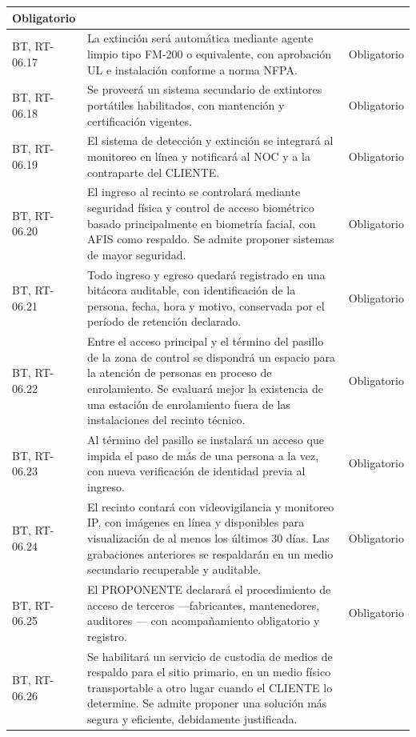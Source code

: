 \begin{longtable}{|L{0.098425\AnchoTablaAnexo}|L{0.814961\AnchoTablaAnexo}|L{0.086614\AnchoTablaAnexo}|}
Obligatorio \\ \hline
{}
BT, RT-06.17 &
La extinción será automática mediante agente limpio tipo FM-200 o equivalente, con aprobación UL e instalación conforme a norma NFPA. &
Obligatorio \\ \hline
BT, RT-06.18 &
Se proveerá un sistema secundario de extintores portátiles habilitados, con mantención y certificación vigentes. &
Obligatorio \\ \hline
{}
BT, RT-06.19 &
El sistema de detección y extinción se integrará al monitoreo en línea y notificará al NOC y a la contraparte del CLIENTE. &
Obligatorio \\ \hline
BT, RT-06.20 &
El ingreso al recinto se controlará mediante seguridad física y control de acceso biométrico basado principalmente en biometría facial, con AFIS como respaldo. Se admite proponer sistemas de mayor seguridad. &
Obligatorio \\ \hline
{}
BT, RT-06.21 &
Todo ingreso y egreso quedará registrado en una bitácora auditable, con identificación de la persona, fecha, hora y motivo, conservada por el período de retención declarado. &
Obligatorio \\ \hline
BT, RT-06.22 &
Entre el acceso principal y el término del pasillo de la zona de control se dispondrá un espacio para la atención de personas en proceso de enrolamiento. Se evaluará mejor la existencia de una estación de enrolamiento fuera de las instalaciones del recinto técnico. &
Obligatorio \\ \hline
{}
BT, RT-06.23 &
Al término del pasillo se instalará un acceso que impida el paso de más de una persona a la vez, con nueva verificación de identidad previa al ingreso. &
Obligatorio \\ \hline
BT, RT-06.24 &
El recinto contará con videovigilancia y monitoreo IP, con imágenes en línea y disponibles para visualización de al menos los últimos 30 días. Las grabaciones anteriores se respaldarán en un medio secundario recuperable y auditable. &
Obligatorio \\ \hline
{}
BT, RT-06.25 &
El PROPONENTE declarará el procedimiento de acceso de terceros —fabricantes, mantenedores, auditores — con acompañamiento obligatorio y registro. &
Obligatorio \\ \hline
BT, RT-06.26 &
Se habilitará un servicio de custodia de medios de respaldo para el sitio primario, en un medio físico transportable a otro lugar cuando el CLIENTE lo determine. Se admite proponer una solución más segura y eficiente, debidamente justificada. &

\end{longtable}
